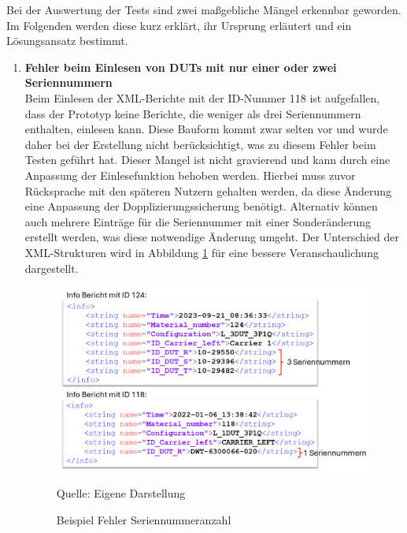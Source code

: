 Bei der Auswertung der Tests sind zwei maßgebliche Mängel erkennbar geworden.
Im Folgenden werden diese kurz erklärt, ihr Ursprung erläutert und ein Lösungsansatz bestimmt.

\begin{enumerate}


\item \textbf{Fehler beim Einlesen von DUTs mit nur einer oder zwei Seriennummern} \\
Beim Einlesen der XML-Berichte mit der ID-Nummer 118 ist aufgefallen, dass der Prototyp keine Berichte, die weniger als drei Seriennummern enthalten, einlesen kann.
Diese Bauform kommt zwar selten vor und wurde daher bei der Erstellung nicht berücksichtigt, was zu diesem Fehler beim Testen geführt hat.
Dieser Mangel ist nicht gravierend und kann durch eine Anpassung der Einlesefunktion behoben werden.
Hierbei muss zuvor Rücksprache mit den späteren Nutzern gehalten werden, da diese Änderung eine Anpassung der Dopplizierungssicherung benötigt.
Alternativ können auch mehrere Einträge für die Seriennummer mit einer Sonderänderung erstellt werden, was diese notwendige Änderung umgeht.
Der Unterschied der XML-Strukturen wird in Abbildung \ref{fig:Beispiel Fehler Seriennummeranzahl} für eine bessere Veranschaulichung dargestellt.

\begin{figure}[H]
    \centering
    \includegraphics[width=1\textwidth]{Grafiken/Beispiel Fehler Seriennummeranzahl.png}
    \caption{Beispiel Fehler Seriennummeranzahl}
    \label{fig:Beispiel Fehler Seriennummeranzahl}
    {Quelle: Eigene Darstellung}
\end{figure}


\end{enumerate}
